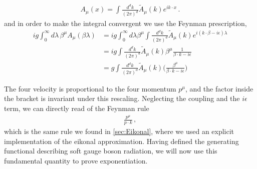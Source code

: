 \begin{align}
    A_{\mu}(x)=\int\frac{d^{d}k}{(2\pi)^{d}}\tilde{A}_{\mu}(k)e^{ik\cdot x}\,.
\end{align}
and in order to make the integral convergent we use the Feynman prescription,
\begin{align}
    ig\int_{0}^{\infty}d\lambda\,\beta^{\mu}A_{\mu}(\beta\lambda)&=ig\int_{0}^{\infty}d\lambda \beta^{\mu}\int\frac{d^{d}k}{(2\pi)^{d}}\tilde{A}_{\mu}(k)e^{i(k\cdot \beta-i\epsilon)\lambda}\nonumber
    \\
    &=ig\int\frac{d^{d}k}{(2\pi)^{d}}\tilde{A}_{\mu}(k)\beta^{\mu}\frac{1}{\beta\cdot k - i\epsilon}\nonumber
    \\
    &=g\int\frac{d^{d}k}{(2\pi)^{d}}\tilde{A}_{\mu}(k)\Big(\frac{\beta^{\mu}}{\beta\cdot k-i\epsilon}\Big)
\end{align}

The four velocity is proportional to the four momentum $p^{\mu}$, and the factor inside the bracket is invariant under this rescaling. Neglecting the coupling and the $i\epsilon$ term, we can directly read of the Feynman rule
\begin{align}
    \frac{p^{\mu}}{p\cdot k}\,,
\end{align}
which is the same rule we found in \cref{sec:Eikonal}, where we used an explicit implementation of the eikonal approximation. Having defined the generating functional describing soft gauge boson radiation, we will now use this fundamental quantity to prove exponentiation.





